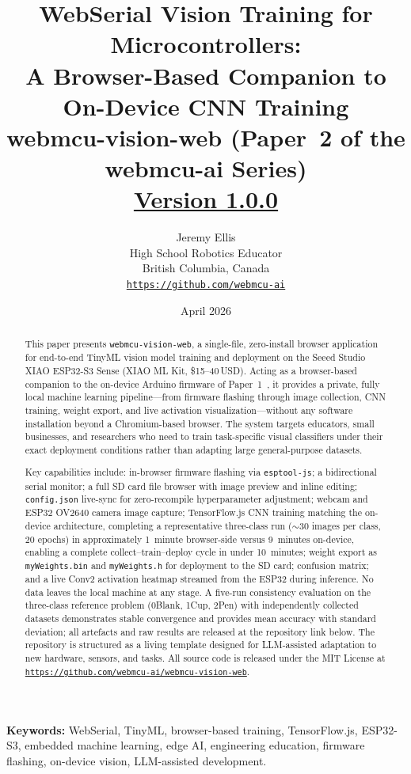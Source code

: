 \documentclass[11pt]{article}
\title{\textbf{WebSerial Vision Training for Microcontrollers:\\
A Browser-Based Companion to On-Device CNN Training}\\[0.4em]
{\large webmcu-vision-web (Paper~2 of the webmcu-ai Series)}\\[4pt]
{\small \href{https://github.com/webmcu-ai/webmcu-vision-web/releases/tag/v1.0.0}{Version 1.0.0}}}
\author{
  Jeremy Ellis\\
  High School Robotics Educator\\
  British Columbia, Canada\\
  \href{https://github.com/webmcu-ai}{\texttt{https://github.com/webmcu-ai}}
}
\date{April 2026}
\begin{document}
\maketitle

\begin{abstract}
This paper presents \texttt{webmcu-vision-web}, a single-file, zero-install browser
application for end-to-end TinyML vision model training and deployment on the
Seeed Studio XIAO ESP32-S3 Sense (XIAO ML Kit, \$15--40\,USD). Acting as a browser-based companion to the
on-device Arduino firmware of Paper~1~\cite{ellis2026ondevice}, it provides a
private, fully local machine learning pipeline---from firmware flashing through image
collection, CNN training, weight export, and live activation visualization---without
any software installation beyond a Chromium-based browser. The system targets
educators, small businesses, and researchers who need to train task-specific visual
classifiers under their exact deployment conditions rather than adapting large
general-purpose datasets.

Key capabilities include: in-browser firmware flashing via \texttt{esptool-js};
a bidirectional serial monitor; a full SD card file browser with image preview and
inline editing; \texttt{config.json} live-sync for zero-recompile hyperparameter
adjustment; webcam and ESP32 OV2640 camera image capture; TensorFlow.js CNN training
matching the on-device architecture, completing a representative three-class run
($\sim$30 images per class, 20 epochs) in approximately 1~minute browser-side versus
9~minutes on-device, enabling a complete collect--train--deploy cycle in under
10~minutes; weight export as \texttt{myWeights.bin} and \texttt{myWeights.h} for
deployment to the SD card; confusion matrix; and a live Conv2 activation heatmap
streamed from the ESP32 during inference. No data leaves the local machine at any
stage. A five-run consistency evaluation on the three-class reference problem
(0Blank, 1Cup, 2Pen) with independently collected datasets demonstrates stable
convergence and provides mean accuracy with standard deviation; all artefacts and
raw results are released at the repository link below. The repository is structured as a living template designed for
LLM-assisted adaptation to new hardware, sensors, and tasks. All source code is
released under the MIT License at
\href{https://github.com/webmcu-ai/webmcu-vision-web}{\texttt{https://github.com/webmcu-ai/webmcu-vision-web}}.
\end{abstract}

\textbf{Keywords:} WebSerial, TinyML, browser-based training, TensorFlow.js, ESP32-S3,
embedded machine learning, edge AI, engineering education, firmware flashing,
on-device vision, LLM-assisted development.
\end{document}
